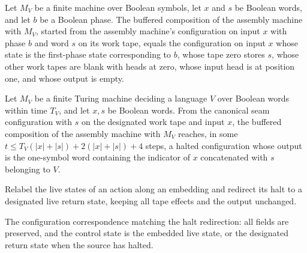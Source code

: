 \begin{lemma}
\label{Complexity.enumCont_round_seam}
\leanok
{}
Let $M_V$ be a finite machine over Boolean symbols, let $x$ and $s$ be Boolean words,
and let $b$ be a Boolean phase. The buffered composition of the assembly machine with
$M_V$, started from the assembly machine's configuration on input $x$ with phase $b$ and
word $s$ on its work tape, equals the configuration on input $x$ whose state is the
first-phase state corresponding to $b$, whose tape zero stores $s$, whose other work
tapes are blank with heads at zero, whose input head is at position one, and whose
output is empty.
\end{lemma}

\begin{lemma}
\label{Complexity.enumCont_verifier_call}
\leanok
{}
Let $M_V$ be a finite Turing machine deciding a language $V$ over Boolean words within
time $T_V$, and let $x,s$ be Boolean words. From the canonical seam configuration with
$s$ on the designated work tape and input $x$, the buffered composition of the assembly
machine with $M_V$ reaches, in some $t\le T_V(|x|+|s|)+2(|x|+|s|)+4$ steps, a halted
configuration whose output is the one-symbol word containing the indicator of $x$
concatenated with $s$ belonging to $V$.
\end{lemma}

\begin{definition}
\label{Complexity.enumCont_returnAction}
\leanok
{}
Relabel the live states of an action along an embedding and redirect its halt to
a designated live return state, keeping all tape effects and the output
unchanged.
\end{definition}

\begin{definition}
\label{Complexity.enumCont_returnCfg}
\leanok
{}
The configuration correspondence matching the halt redirection: all fields are
preserved, and the control state is the embedded live state, or the designated
return state when the source has halted.
\end{definition}


